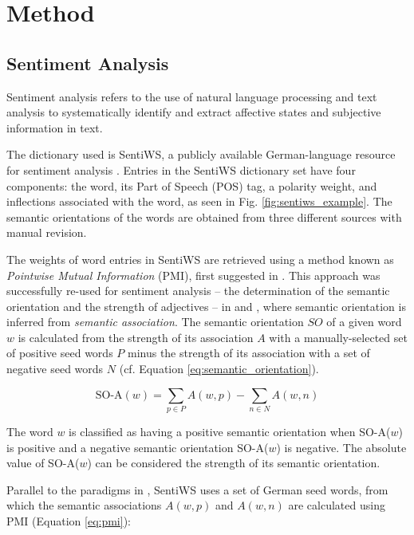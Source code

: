 \documentclass[12pt,onecolumn,twoside]{layout}
\begin{document}
\section{Method} \label{sec:method}
\subsection*{Sentiment Analysis}

Sentiment analysis refers to the use of natural language processing and text analysis to systematically identify and extract affective states and subjective information in text. %

The dictionary used is SentiWS, a publicly available German-language resource for sentiment analysis \cite{REMUS10.490}. Entries in the SentiWS dictionary set have four components: the word, its Part of Speech (POS) tag, a polarity weight, and inflections associated with the word, as seen in Fig. \ref{fig:sentiws_example}. The semantic orientations of the words are obtained from three different sources with manual revision. 

The weights of word entries in SentiWS are retrieved using a method known as \emph{Pointwise Mutual Information} (PMI), first suggested in \cite{church-hanks-1990-word}. This approach was successfully re-used for sentiment analysis -- the determination of the semantic orientation and the strength of adjectives -- in \cite{Turney2002} and \cite{Turney2003}, where semantic orientation is inferred from \emph{semantic association}. The semantic orientation \(SO\) of a given word \(w\) is calculated from the strength of its association \(A\) with a manually-selected set of positive seed words \(P\) minus the strength of its association with a set of negative seed words \(N\) (cf. Equation \ref{eq:semantic_orientation}). 

\begin{equation}
\label{eq:semantic_orientation}
\text{SO-A}(w) = \sum_{p \in P}A(w,p) - \sum_{n \in N}A(w,n)
\end{equation}

The word \(w\) is classified as having a positive semantic orientation when SO-A(\(w\)) is positive and a negative semantic orientation SO-A(\(w\)) is negative. The absolute value of SO-A(\(w\)) can be considered the strength of its semantic orientation. 

Parallel to the paradigms in \cite{Turney2003}, SentiWS uses a set of German seed words, from which the semantic associations \(A(w,p)\) and \(A(w,n)\) are calculated using PMI (Equation \ref{eq:pmi}): 
\end{document}
